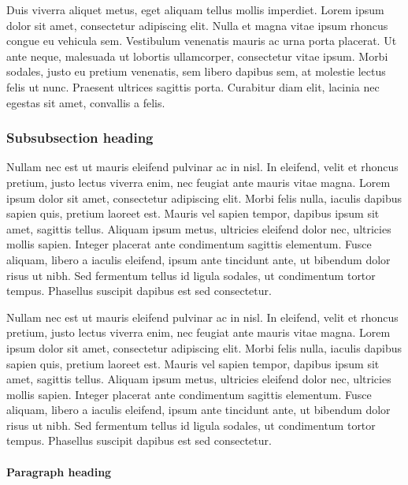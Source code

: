 \documentclass[doc,longtable]{apa6}
\begin{document}
Duis viverra aliquet metus, eget aliquam tellus mollis imperdiet. Lorem
ipsum dolor sit amet, consectetur adipiscing elit. Nulla et magna vitae
ipsum rhoncus congue eu vehicula sem. Vestibulum venenatis mauris ac
urna porta placerat. Ut ante neque, malesuada ut lobortis ullamcorper,
consectetur vitae ipsum. Morbi sodales, justo eu pretium venenatis, sem
libero dapibus sem, at molestie lectus felis ut nunc. Praesent ultrices
sagittis porta. Curabitur diam elit, lacinia nec egestas sit amet,
convallis a felis.

\hypertarget{subsubsection-heading}{%
\subsubsection{Subsubsection heading}\label{subsubsection-heading}}

Nullam nec est ut mauris eleifend pulvinar ac in nisl. In eleifend,
velit et rhoncus pretium, justo lectus viverra enim, nec feugiat ante
mauris vitae magna. Lorem ipsum dolor sit amet, consectetur adipiscing
elit. Morbi felis nulla, iaculis dapibus sapien quis, pretium laoreet
est. Mauris vel sapien tempor, dapibus ipsum sit amet, sagittis tellus.
Aliquam ipsum metus, ultricies eleifend dolor nec, ultricies mollis
sapien. Integer placerat ante condimentum sagittis elementum. Fusce
aliquam, libero a iaculis eleifend, ipsum ante tincidunt ante, ut
bibendum dolor risus ut nibh. Sed fermentum tellus id ligula sodales, ut
condimentum tortor tempus. Phasellus suscipit dapibus est sed
consectetur.

Nullam nec est ut mauris eleifend pulvinar ac in nisl. In eleifend,
velit et rhoncus pretium, justo lectus viverra enim, nec feugiat ante
mauris vitae magna. Lorem ipsum dolor sit amet, consectetur adipiscing
elit. Morbi felis nulla, iaculis dapibus sapien quis, pretium laoreet
est. Mauris vel sapien tempor, dapibus ipsum sit amet, sagittis tellus.
Aliquam ipsum metus, ultricies eleifend dolor nec, ultricies mollis
sapien. Integer placerat ante condimentum sagittis elementum. Fusce
aliquam, libero a iaculis eleifend, ipsum ante tincidunt ante, ut
bibendum dolor risus ut nibh. Sed fermentum tellus id ligula sodales, ut
condimentum tortor tempus. Phasellus suscipit dapibus est sed
consectetur.

\hypertarget{paragraph-heading}{%
\paragraph{Paragraph heading}\label{paragraph-heading}}
\end{document}
